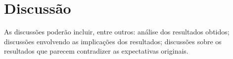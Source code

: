 \chapter{Discuss\~ao}
\label{chap:disc}


As discussões poderão incluir, entre outros: análise dos resultados obtidos; discussões envolvendo as implicações dos resultados; discussões sobre os resultados que parecem contradizer as expectativas originais.

